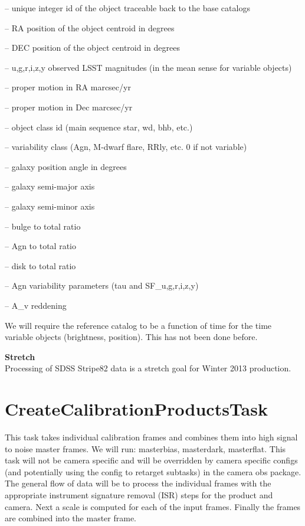 \documentclass[12pt]{article}
\begin{document}
-- unique integer id of the object traceable back to the base catalogs

-- RA position of the object centroid in degrees

-- DEC position of the object centroid in degrees

-- {u,g,r,i,z,y} observed LSST magnitudes (in the mean sense for variable objects)

-- proper motion in RA marcsec/yr

-- proper motion in Dec marcsec/yr

-- object class id (main sequence star, wd, bhb, etc.)

-- variability class (Agn, M-dwarf flare, RRly, etc.  0 if not variable)

-- galaxy position angle in degrees 

-- galaxy semi-major axis 

-- galaxy semi-minor axis

-- bulge to total ratio

-- Agn to total ratio

-- disk to total ratio

-- Agn variability parameters (tau and SF\_{u,g,r,i,z,y})

-- A\_v reddening 


We will require the reference catalog to be a function of time for
the time variable objects (brightness, position).  This has not been
done before.

{\bf Stretch}\\
Processing of SDSS Stripe82 data is a stretch goal for Winter 2013
production.


\clearpage 
\section{CreateCalibrationProductsTask} 
This task takes individual calibration frames and combines them into
high signal to noise master frames.  We will run: masterbias, masterdark, masterflat.  
This task will not be camera specific and will be overridden by camera specific configs (and potentially
using the config to retarget subtasks) in the camera obs package.  The general flow of data will be to process the individual frames
with the appropriate instrument signature removal (ISR) steps for the product and camera.  Next a scale is computed for each of the input
frames.  Finally the frames are combined into the master frame.
\end{document}
